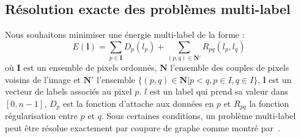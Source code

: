 \documentclass[../main/These_Mathias_Paget.tex]{subfiles}
\begin{document}
\subsection{Résolution exacte des problèmes multi-label}
	\label{ss::multi_label}

Nous souhaitons minimiser une énergie multi-label de la forme :
	\begin{equation}
	\label{eq:Emulti}
	E(\boldsymbol{l}) = \sum_{p \in \boldsymbol{I}} D_p(l_p) +  \sum_{(p,q) \in \boldsymbol{N'}} R_{pq}(l_p,l_q)
	\end{equation}
	où $\boldsymbol{I}$ est un ensemble de pixels ordonnés, $\boldsymbol{N}$ l'ensemble des couples de pixels voisins de l'image et $\boldsymbol{N'}$ l'ensemble $\{(p,q) \in \boldsymbol{N} | p<q, p\in I ,q \in I\}$, $\boldsymbol{l}$ est un vecteur de labels associés au pixel $p$. $l$ est un label qui prend sa valeur dans $[0,n-1]$, $D_p$ est la fonction d'attache aux données en $p$ et $R_{pq}$ la fonction régularisation entre $p$ et $q$. Sous certaines conditions, un problème multi-label peut être résolue exactement par coupure de graphe comme montré par~\cite{Ishikawa03PAMI}.
	
\end{document}
